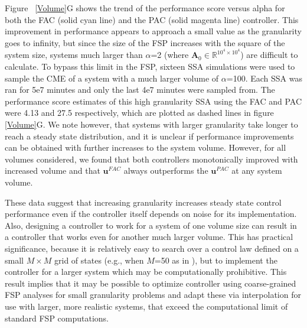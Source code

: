 \documentclass[12pt]{article}
\begin{document}
Figure \ \ref{Volume}G shows the trend of the performance score versus alpha for both the FAC (solid cyan line) and the PAC (solid magenta line) controller. This improvement in performance appears to approach a small value as the granularity goes to infinity, but since the size of the FSP increases with the square of the system size, systems much larger than $\alpha$=2 (where $\mathbf{A}_0\in \mathbb{R}^{10^4\times10^4}$) are difficult to calculate. To bypass this limit in the FSP, sixteen SSA simulations were used to sample the CME of a system with a much larger volume of $\alpha$=100. Each SSA was ran for 5e7 minutes and only the last 4e7 minutes were sampled from. The performance score estimates of this high granularity SSA using the FAC and PAC were 4.13 and 27.5 respectively, which are plotted as dashed lines in figure \ref{Volume}G. We note however, that systems with larger granularity take longer to reach a steady state distribution, and it is unclear if performance improvements can be obtained with further increases to the system volume.  However, for all volumes considered, we found that both controllers monotonically improved with increased volume and that $\mathbf{u}^{FAC}$ always outperforms the $\mathbf{u}^{PAC}$ at any system volume. 

These data suggest that increasing granularity increases steady state control performance even if the controller itself depends on noise for its implementation. Also, designing a controller to work for a system of one volume size can result in a controller that works even for another much larger volume.  This has practical significance, because it is relatively easy to search over a control law defined on a small $M\times M$ grid of states (e.g., when $M$=50 as in \cite{May2021}), but to implement the controller for a larger system which may be computationally prohibitive. This result implies that it may be possible to optimize controller using coarse-grained FSP analyses for small granularity problems and adapt these via interpolation for use with larger, more realistic systems, that exceed the computational limit of standard FSP computations.  
\end{document}
